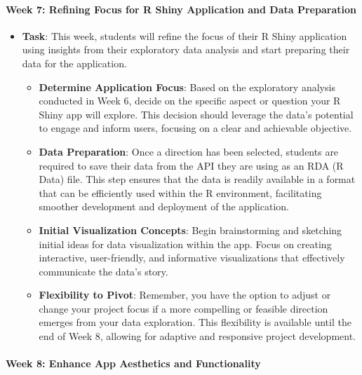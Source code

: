 \documentclass[
  letterpaper,
  DIV=11,
  numbers=noendperiod]{scrartcl}
\let\oldparagraph\paragraph
\renewcommand{\paragraph}[1]{\oldparagraph{#1}\mbox{}}
\providecommand{\tightlist}{%
  \setlength{\itemsep}{0pt}\setlength{\parskip}{0pt}}\usepackage{longtable,booktabs,array}
\begin{document}
\hypertarget{week-7-refining-focus-for-r-shiny-application-and-data-preparation}{%
\paragraph{Week 7: Refining Focus for R Shiny Application and Data
Preparation}\label{week-7-refining-focus-for-r-shiny-application-and-data-preparation}}

\begin{itemize}
\tightlist
\item
  \textbf{Task}: This week, students will refine the focus of their R
  Shiny application using insights from their exploratory data analysis
  and start preparing their data for the application.

  \begin{itemize}
  \tightlist
  \item
    \textbf{Determine Application Focus}: Based on the exploratory
    analysis conducted in Week 6, decide on the specific aspect or
    question your R Shiny app will explore. This decision should
    leverage the data's potential to engage and inform users, focusing
    on a clear and achievable objective.
  \item
    \textbf{Data Preparation}: Once a direction has been selected,
    students are required to save their data from the API they are using
    as an RDA (R Data) file. This step ensures that the data is readily
    available in a format that can be efficiently used within the R
    environment, facilitating smoother development and deployment of the
    application.
  \item
    \textbf{Initial Visualization Concepts}: Begin brainstorming and
    sketching initial ideas for data visualization within the app. Focus
    on creating interactive, user-friendly, and informative
    visualizations that effectively communicate the data's story.
  \item
    \textbf{Flexibility to Pivot}: Remember, you have the option to
    adjust or change your project focus if a more compelling or feasible
    direction emerges from your data exploration. This flexibility is
    available until the end of Week 8, allowing for adaptive and
    responsive project development.
  \end{itemize}
\end{itemize}

\hypertarget{week-8-enhance-app-aesthetics-and-functionality}{%
\paragraph{Week 8: Enhance App Aesthetics and
Functionality}\label{week-8-enhance-app-aesthetics-and-functionality}}
\end{document}
